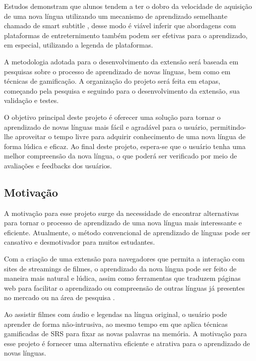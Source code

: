 \documentclass[12pt]{article}
\begin{document}
Estudos demonstram que alunos tendem a ter o dobro da velocidade de aquisição de uma nova língua utilizando um mecanismo de aprendizado semelhante chamado de smart subtitle \cite{Kovacs13}, desse modo é viável inferir que abordagens com plataformas de entreternimento também podem ser efetivas para o aprendizado, em especial, utilizando a legenda de plataformas. 

A metodologia adotada para o desenvolvimento da extensão será baseada em pesquisas sobre o processo de aprendizado de novas línguas, bem como em técnicas de gamificação. A organização do projeto será feita em etapas, começando pela pesquisa e seguindo para o desenvolvimento da extensão, sua validação e testes.

O objetivo principal deste projeto é oferecer uma solução para tornar o aprendizado de novas línguas mais fácil e agradável para o usuário, permitindo-lhe aproveitar o tempo livre para adquirir conhecimento de uma nova língua de forma lúdica e eficaz. Ao final deste projeto, espera-se que o usuário tenha uma melhor compreensão da nova língua, o que poderá ser verificado por meio de avaliações e feedbacks dos usuários.

\subsection{Motivação}
A motivação para esse projeto surge da necessidade de encontrar alternativas para tornar o processo de aprendizado de uma nova língua mais interessante e eficiente. Atualmente, o método convencional de aprendizado de línguas pode ser cansativo e desmotivador para muitos estudantes. 

Com a criação de uma extensão para navegadores que permita a interação com sites de streamings de filmes, o aprendizado da nova língua pode ser feito de maneira mais natural e lúdica, assim como ferramentas que traduzem páginas web para facilitar o aprendizado ou compreensão de outras línguas já presentes no mercado ou na área de pesquisa \cite{ElBatanony21}.

Ao assistir filmes com áudio e legendas na língua original, o usuário pode aprender de forma não-intrusiva, ao mesmo tempo em que aplica técnicas gamificadas de SRS para fixar as novas palavras na memória. A motivação para esse projeto é fornecer uma alternativa eficiente e atrativa para o aprendizado de novas línguas.
\end{document}
